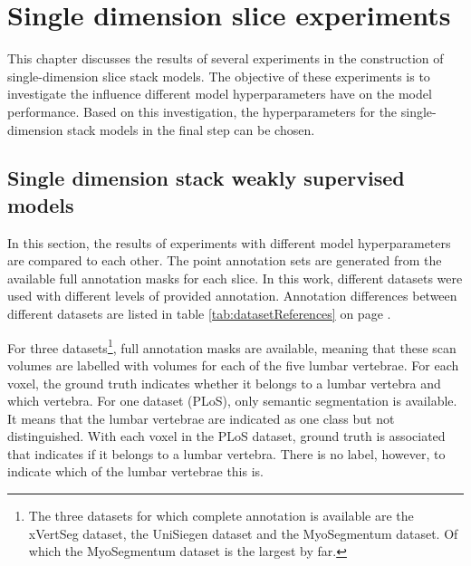 \chapter{Single dimension slice experiments \label{sec:singleDimension}}\thispagestyle{empty}
\par{
    This chapter discusses the results of several experiments in the construction of single-dimension slice stack models.
    The objective of these experiments is to investigate the influence different model hyperparameters have on the model performance.
    Based on this investigation, the hyperparameters for the single-dimension stack models in the final step can be chosen.  
}
\section{Single dimension stack weakly supervised models}
\par{
    In this section, the results of experiments with different model hyperparameters are compared to each other.
    The point annotation sets are generated from the available full annotation masks for each slice.
    In this work, different datasets were used with different levels of provided annotation. 
    Annotation differences between different datasets are listed in table \ref{tab:datasetReferences} on page \pageref{tab:datasetReferences}.
}
\par{
    For three datasets\footnote{The three datasets for which complete annotation is available are the xVertSeg dataset, the UniSiegen dataset and the MyoSegmentum dataset. Of which the MyoSegmentum dataset is the largest by far.},
    full annotation masks are available, meaning that these scan volumes are labelled with volumes for each of the five lumbar vertebrae.
    For each voxel, the ground truth indicates whether it belongs to a lumbar vertebra and which vertebra.
    For one dataset (PLoS), only semantic segmentation is available. It means that the lumbar vertebrae are indicated as one class but not distinguished. 
    With each voxel in the PLoS dataset, ground truth is associated that indicates if it belongs to a lumbar vertebra. There is no label, however, to indicate which of the lumbar vertebrae this is.
}
